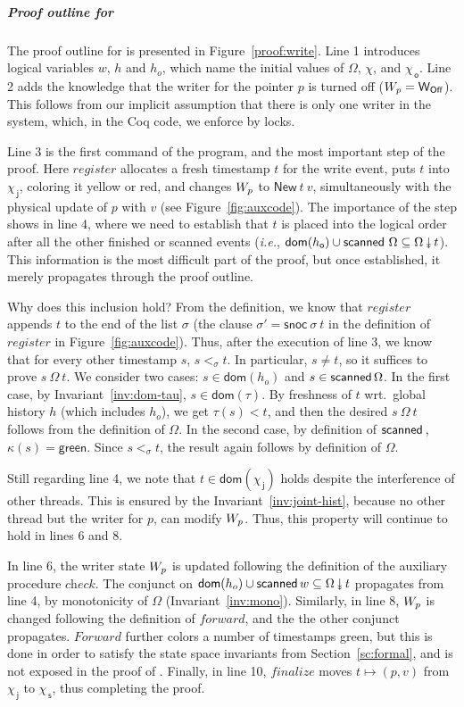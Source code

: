 \documentclass[a4paper,UKenglish]{lipics-v2016}
\newcommand{\ie}{\emph{i.e.}\xspace}
\newcommand{\dom}[1]{\mathsf{dom}(#1)}
\newcommand{\aux}[1]{\textit{#1}}
\newcommand{\selfsub}{\mathsf{s}}
\newcommand{\othersub}{\mathsf{o}}
\newcommand{\jointsub}{\mathsf{j}}
\newcommand{\hist}{\chi}
\newcommand{\histS}{\hist_{\, \selfsub}}
\newcommand{\histO}{\hist_{\, \othersub}}
\newcommand{\histJ}{\hist_{\, \jointsub}}
\def\ordlist{\sigma}
\newcommand{\E}{\tau}
\newcommand{\C}{\kappa}
\newcommand{\tle}{\mathrel{<_\ordlist}}
\newcommand{\stableorder}{\Omega}
\def\ordlistP{\sigma'}
\newcommand{\wInit}{\mathsf{W_{Off}}}
\newcommand{\wWrite}{\mathsf{New}}
\theoremstyle{definition}
\begin{document}
\subparagraph*{Proof outline for \jywrite}
%
The proof outline for \jywrite is presented in
Figure~\ref{proof:write}.
%
Line 1 introduces logical variables $w$, $h$ and $h_o$, which name the
initial values of $\stableorder$, $\hist$, and $\histO$.
%
Line 2 adds the knowledge that the writer for the pointer $p$ is
turned off ($\wpp = \wInit$). This follows from our implicit
assumption that there is only one writer in the system, which, in the
Coq code, we enforce by locks.

Line 3 is the first command of the program, and the most important
step of the proof. Here $\aux{register}$ allocates a fresh timestamp
$t$ for the write event, puts $t$ into $\histJ$, coloring it yellow or
red, and changes $W_p$ to $\wWrite\ t\ v$, simultaneously with the
physical update of $p$ with $v$ (see Figure~\ref{fig:auxcode}). The
importance of the step shows in line 4, where we need to establish
that $t$ is placed into the logical order after all the other finished
or scanned events (\ie, $ \dom{h_\othersub} \cup \scanned\,
\stableorder \subseteq \sideal{\stableorder}{t}$). This information is
the most difficult part of the proof, but once established, it merely
propagates through the proof outline.

Why does this inclusion hold? From the definition, we know that
$\aux{register}$ appends $t$ to the end of the list $\ordlist$ (the
clause $\ordlistP = \mathsf{snoc}\ {\ordlist}\ t$ in the definition of
$\aux{register}$ in Figure~\ref{fig:auxcode}). Thus, after the
execution of line 3, we know that for every other timestamp $s$, $s
\tle t$. In particular, $s \neq t$, so it suffices to prove
$s\ {\stableorder}\ t$.
%
We consider two cases: $s \in \dom{h_o}$ and $s \in
\scanned{\stableorder}$.  In the first case, by
Invariant~\ref{inv:dom-tau}, $s \in \dom{\E}$. By freshness of $t$
wrt.~global history $h$ (which includes $h_o$), we get $\E(s) < t$,
and then the desired $s\ {\stableorder}\ t$ follows from the
definition of $\stableorder$.  In the second case, by definition of
$\scanned$, $\C(s) = \mathsf{green}$. Since $s \tle t$, the result
again follows by definition of $\stableorder$.

Still regarding line 4, we note that $t \in \dom{\histJ}$ holds
despite the interference of other threads. This is ensured by the
Invariant~\ref{inv:joint-hist}, because no other thread but the writer
for $p$, can modify $W_p$. Thus, this property will continue to hold
in lines 6 and 8.

In line 6, the writer state $W_p$ is updated following the definition
of the auxiliary procedure $\aux{check}$. The conjunct on $\dom{h_o}
\cup \scanned{w} \subseteq \sideal{\stableorder}{t}$ propagates from
line 4, by monotonicity of $\stableorder$ (Invariant~\ref{inv:mono}).
%
Similarly, in line 8, $W_p$ is changed following the definition of
$\aux{forward}$, and the the other conjunct
propagates. $\aux{Forward}$ further colors a number of timestamps
green, but this is done in order to satisfy the state space invariants
from Section~\ref{sc:formal}, and is not exposed in the proof of
\jywrite.
%
Finally, in line 10, $\aux{finalize}$ moves $t\mapsto(p, v)$ from
$\histJ$ to $\histS$, thus completing the proof. 
\end{document}
